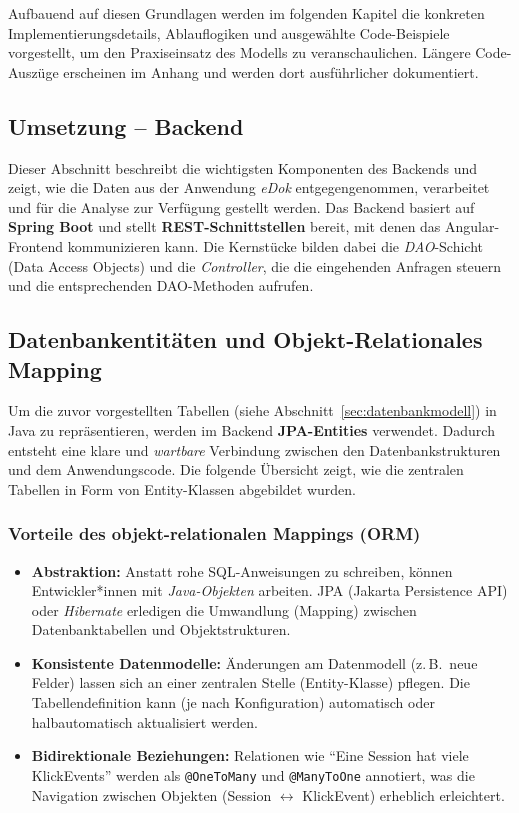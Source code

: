 \documentclass[12pt,oneside]{article}
\begin{document}
Aufbauend auf diesen Grundlagen werden im folgenden Kapitel die konkreten Implementierungsdetails, Ablauflogiken und ausgewählte Code-Beispiele vorgestellt, um den Praxiseinsatz des Modells zu veranschaulichen. Längere Code-Auszüge erscheinen im Anhang und werden dort ausführlicher dokumentiert. 


\subsection{Umsetzung -- Backend}
\label{sec:umsetzung_backend}

Dieser Abschnitt beschreibt die wichtigsten Komponenten des Backends und zeigt, wie die Daten aus der Anwendung \textit{eDok} entgegengenommen, verarbeitet und für die Analyse zur Verfügung gestellt werden. Das Backend basiert auf \textbf{Spring Boot} und stellt \textbf{REST-Schnittstellen} bereit, mit denen das Angular-Frontend kommunizieren kann. Die Kernstücke bilden dabei die \emph{DAO}-Schicht (Data Access Objects) und die \emph{Controller}, die die eingehenden Anfragen steuern und die entsprechenden DAO-Methoden aufrufen.
\subsection{Datenbankentitäten und Objekt-Relationales Mapping}
\label{subsec:entities_orm}

Um die zuvor vorgestellten Tabellen (siehe Abschnitt~\ref{sec:datenbankmodell}) in Java zu repräsentieren, werden im Backend \textbf{JPA-Entities} verwendet. Dadurch entsteht eine klare und \emph{wartbare} Verbindung zwischen den Datenbankstrukturen und dem Anwendungscode. Die folgende Übersicht zeigt, wie die zentralen Tabellen in Form von Entity-Klassen abgebildet wurden.

\subsubsection{Vorteile des objekt-relationalen Mappings (ORM)}
\begin{itemize}
    \item \textbf{Abstraktion:} Anstatt rohe SQL-Anweisungen zu schreiben, können Entwickler*innen mit \emph{Java-Objekten} arbeiten. JPA (Jakarta Persistence API) oder \emph{Hibernate} erledigen die Umwandlung (Mapping) zwischen Datenbanktabellen und Objektstrukturen.
    \item \textbf{Konsistente Datenmodelle:} Änderungen am Datenmodell (z.\,B.\ neue Felder) lassen sich an einer zentralen Stelle (Entity-Klasse) pflegen. Die Tabellendefinition kann (je nach Konfiguration) automatisch oder halbautomatisch aktualisiert werden.
    \item \textbf{Bidirektionale Beziehungen:} Relationen wie \enquote{Eine Session hat viele KlickEvents} werden als \lstinline|@OneToMany| und \lstinline|@ManyToOne| annotiert, was die Navigation zwischen Objekten (Session $\leftrightarrow$ KlickEvent) erheblich erleichtert.
\end{itemize}
\end{document}
